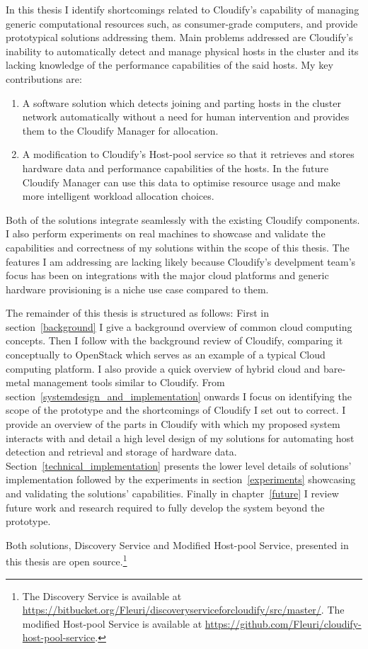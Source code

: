 In this thesis I identify shortcomings related to Cloudify's capability of managing generic computational resources such, as consumer-grade computers, and provide prototypical solutions addressing them. Main problems addressed are Cloudify's inability to automatically detect and manage physical hosts in the cluster and its lacking knowledge of the performance capabilities of the said hosts. My key contributions are:

\begin{enumerate}
\item  A software solution which detects joining and parting hosts in the cluster network automatically without a need for human intervention and provides them to the Cloudify Manager for allocation.
\item A modification to Cloudify's Host-pool service so that it retrieves and stores hardware data and performance capabilities of the hosts. In the future Cloudify Manager can use this data to optimise resource usage and make more intelligent workload allocation choices.
\end{enumerate}

Both of the solutions integrate seamlessly with the existing Cloudify components. I also perform experiments on real machines to showcase and validate the capabilities and correctness of my solutions within the scope of this thesis. The features I am addressing are lacking likely because Cloudify's develpment team's focus has been on integrations with the major cloud platforms and generic hardware provisioning is a niche use case compared to them.

The remainder of this thesis is structured as follows: First in section~\ref{background} I give a background overview of common cloud computing concepts. Then I follow with the background review of Cloudify, comparing it conceptually to OpenStack which serves as an example of a typical Cloud computing platform. I also provide a quick overview of hybrid cloud and bare-metal management tools similar to Cloudify.
From section~\ref{systemdesign_and_implementation} onwards I focus on identifying the scope of the prototype and the shortcomings of Cloudify I set out to correct. I provide an overview of the parts in Cloudify with which my proposed system interacts with and detail a high level design of my solutions for automating host detection and retrieval and storage of hardware data. Section~\ref{technical_implementation} presents the lower level details of solutions' implementation followed by the experiments in section~\ref{experiments} showcasing and validating the solutions' capabilities. Finally in chapter~\ref{future} I review future work and research required to fully develop the system beyond the prototype.

Both solutions, Discovery Service and Modified Host-pool Service, presented in this thesis are open source.\footnote{The Discovery Service is available at \url{https://bitbucket.org/Fleuri/discoveryserviceforcloudify/src/master/}. The modified Host-pool Service is available at \url{https://github.com/Fleuri/cloudify-host-pool-service}.}

\pagebreak